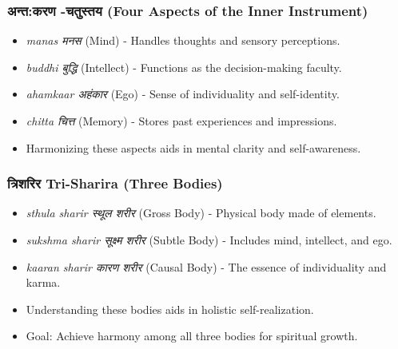 \begin{frame}[fragile]\frametitle{अन्त:करण -चतुस्तय  (Four Aspects of the Inner Instrument)}

      \begin{itemize}
		\item \textit{manas मनस } (Mind) - Handles thoughts and sensory perceptions.
		\item \textit{buddhi बुद्धि } (Intellect) - Functions as the decision-making faculty.
		\item \textit{ahamkaar अहंकार } (Ego) - Sense of individuality and self-identity.
		\item \textit{chitta चित्त } (Memory) - Stores past experiences and impressions.
		\item Harmonizing these aspects aids in mental clarity and self-awareness.
	  \end{itemize}

\end{frame}

\begin{frame}[fragile]\frametitle{त्रिशरिर  Tri-Sharira (Three Bodies)}

      \begin{itemize}
		\item \textit{sthula sharir स्थूल  शरीर } (Gross Body) - Physical body made of elements.
		\item \textit{sukshma sharir सूक्ष्म  शरीर } (Subtle Body) - Includes mind, intellect, and ego.
		\item \textit{kaaran sharir कारण  शरीर } (Causal Body) - The essence of individuality and karma.
		\item Understanding these bodies aids in holistic self-realization.
		\item Goal: Achieve harmony among all three bodies for spiritual growth.
	  \end{itemize}

\end{frame}

